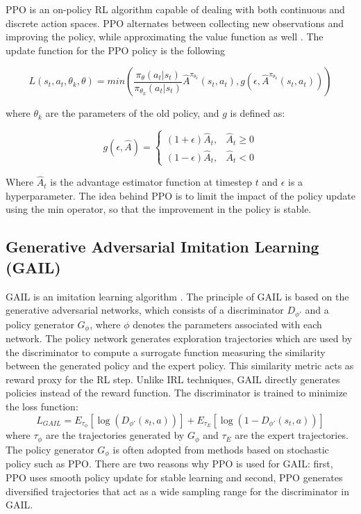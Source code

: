 \documentclass[letterpaper, 10 pt, conference]{ieeeconf}
\begin{document}
PPO is an on-policy RL algorithm capable of dealing with both continuous and discrete action spaces. PPO alternates between collecting new observations and improving the policy, while approximating the value function as well \cite{schulman2017proximal}. The update function for the PPO policy is the following

\begin{footnotesize}
\begin{equation}
L(s_t,a_t,\theta_k, \theta)=min\left(\frac{\pi_{\theta}(a_t|s_t)}{\pi_{\theta_k}(a_t|s_t)} \hat{A}^{\pi_{\theta_k}}(s_t,a_t),g(\epsilon, \hat{A}^{\pi_{\theta_k}}(s_t,a_t))\right)
\end{equation}
\end{footnotesize}
where $\theta_k$ are the parameters of the old policy, and $g$ is defined as:

\begin{footnotesize}
\begin{equation}
g(\epsilon,\hat{A}) = \begin{cases}
    (1+\epsilon)\hat{A}_t, & \hat{A}_t\geq 0\\
    (1-\epsilon)\hat{A}_t,              & \hat{A}_t<0
\end{cases}
\end{equation}
\end{footnotesize}

Where $\hat{A}_t$ is the advantage estimator function at timestep $t$ and $\epsilon$ is a hyperparameter. The idea behind PPO is to limit the impact of the policy update using the min operator, so that the improvement in the policy is stable.
\subsection{Generative Adversarial Imitation Learning (GAIL)\label{sec:gail}}
GAIL is an imitation learning algorithm \cite{ho2016generative}. The principle of GAIL is based on the generative adversarial networks, which consists of a discriminator $D_{\phi'}$ and a policy generator $G_{\phi}$, where $\phi$ denotes the parameters associated with each network. The policy network generates exploration trajectories which are used by the discriminator to compute a surrogate function measuring the similarity between the generated policy and the expert policy. This similarity metric acts as reward proxy for the RL step. Unlike IRL techniques, GAIL directly generates policies instead of the reward function. The discriminator is trained to minimize the loss function:
\begin{equation}
L_{GAIL} = E_{\tau_{\phi}}[\log(D_{\phi'}(s_{t}, a))] + E_{\tau_{E}}[\log(1-D_{\phi'}(s_{t},a))]
\end{equation}
where $\tau_\phi$ are the trajectories generated by $G_\phi$ and $\tau_{E}$ are the expert trajectories. The policy generator $G_{\phi}$ is often adopted from methods based on stochastic policy such as PPO. There are two reasons why PPO is used for GAIL: first, PPO uses smooth policy update for stable learning and second, PPO generates diversified trajectories that act as a wide sampling range for the discriminator in GAIL.
\end{document}
